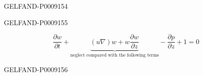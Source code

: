 \begin{GelfandAdjacentEvidence}{GELFAND-P000915}{4}


\end{GelfandAdjacentEvidence}
\begin{GelfandAdjacentEvidence}{GELFAND-P000915}{5}


\begin{equation*}
 \frac{\partial w}{\partial t}
 +\underbrace{(u\nabla)w+w\frac{\partial w}{\partial z}}_{\text{neglect compared with the following terms}}
 -\frac{\partial p}{\partial z}+1=0
\end{equation*}
\end{GelfandAdjacentEvidence}
\begin{GelfandAdjacentEvidence}{GELFAND-P000915}{6}

\end{GelfandAdjacentEvidence}




